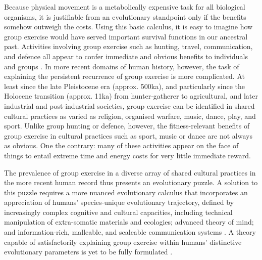 \begin{CJK}{UTF8}{gbsn}
Because physical movement is a metabolically expensive task for all biological organisms, it is justifiable from an evolutionary standpoint only if the benefits somehow outweigh the costs.  Using this basic calculus, it is easy to imagine how group exercise would have served important survival functions in our ancestral past.  Activities involving group exercise such as hunting, travel, communication, and defence all appear to confer immediate and obvious benefits to individuals and groups \citep{Sands2010}.  In more recent domains of human history, however, the task of explaining the persistent recurrence of group exercise is more complicated.  At least since the late Pleistocene era (approx. 500ka), and particularly since the Holocene transition (approx. 11ka) from hunter-gatherer to agricultural, and later industrial and post-industrial societies, group exercise can be identified in shared cultural practices as varied as religion, organised warfare, music, dance, play, and sport.  Unlike group hunting or defence, however, the fitness-relevant benefits of group exercise in cultural practices such as sport, music or dance are not always as obvious.  One the contrary: many of these activities appear on the face of things to entail extreme time and energy costs for very little immediate reward.

The prevalence of group exercise in a diverse array of shared cultural practices in the more recent human record thus presents an evolutionary puzzle.  A solution to this puzzle requires a more nuanced evolutionary calculus that incorporates an appreciation of humans' species-unique evolutionary trajectory, defined by increasingly complex cognitive and cultural capacities, including technical manipulation of extra-somatic materials and ecologies; advanced theory of mind; and information-rich, malleable, and scaleable communication systems \citep{Fuentes2016}.  A theory capable of satisfactorily explaining group exercise within humans' distinctive evolutionary parameters is yet to be fully formulated \citep{Cohen2017}.


\end{CJK}
